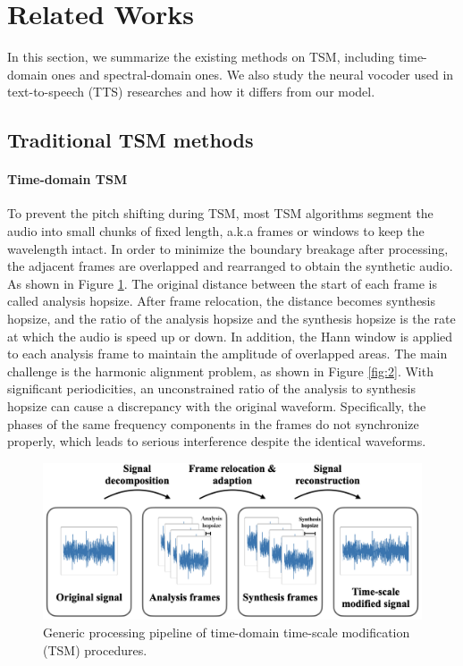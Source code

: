 \documentclass[12pt]{article}
\begin{document}
\section{Related Works}
In this section, we summarize the existing methods on TSM, including time-domain ones and spectral-domain ones. We also study the neural vocoder used in text-to-speech (TTS) researches and how it differs from our model. 

\subsection{Traditional TSM methods}
\paragraph{Time-domain TSM}
To prevent the pitch shifting during TSM, most TSM algorithms segment the audio into small chunks of fixed length, a.k.a frames or windows to keep the wavelength intact. In order to minimize the boundary breakage after processing, the adjacent frames are overlapped and rearranged to obtain the synthetic audio. As shown in Figure \ref{fig:1}. The original distance between the start of each frame is called analysis hopsize. After frame relocation, the distance becomes synthesis hopsize, and the ratio of the analysis hopsize and the synthesis hopsize is the rate at which the audio is speed up or down. In addition, the Hann window \cite{ess86} is applied to each analysis frame to maintain the amplitude of overlapped areas. The main challenge is the harmonic alignment problem, as shown in Figure \ref{fig:2}. With significant periodicities, an unconstrained ratio of the analysis to synthesis hopsize can cause a discrepancy with the original waveform. Specifically, the phases of the same frequency components in the frames do not synchronize properly, which leads to serious interference despite the identical waveforms.


\begin{figure}
\begin{center}
  \includegraphics[width=.8\textwidth]{assets/figures/1}
\end{center}
\caption{Generic processing pipeline of time-domain time-scale modification (TSM) procedures.}
\label{fig:1}
\end{figure}
\end{document}
